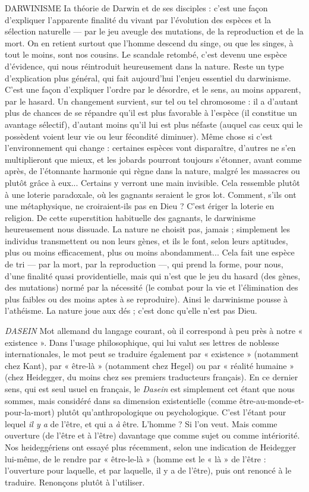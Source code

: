 DARWINISME Ia théorie de Darwin et de ses disciples : c’est une façon
d’expliquer l’apparente finalité du vivant par l’évolution des
espèces et la sélection naturelle — par le jeu aveugle des mutations, de la reproduction
et de la mort. On en retient surtout que l’homme descend du singe, ou
que les singes, à tout le moins, sont nos cousins. Le scandale retombé, c’est
devenu une espèce d’évidence, qui nous réintroduit heureusement dans la
nature. Reste un type d’explication plus général, qui fait aujourd’hui l’enjeu
essentiel du darwinisme. C’est une façon d’expliquer l’ordre par le désordre, et
le sens, au moins apparent, par le hasard. Un changement survient, sur tel ou
tel chromosome : il a d’autant plus de chances de se répandre qu’il est plus
favorable à l’espèce (il constitue un avantage sélectif), d'autant moins qu’il lui
est plus néfaste (auquel cas ceux qui le possèdent voient leur vie ou leur fécondité
diminuer). Même chose si c’est l’environnement qui change : certaines
espèces vont disparaître, d’autres ne s’en multiplieront que mieux, et les jobards
pourront toujours s'étonner, avant comme après, de l’étonnante harmonie qui
règne dans la nature, malgré les massacres ou plutôt grâce à eux... Certains y
verront une main invisible. Cela ressemble plutôt à une loterie paradoxale, où
les gagnants seraient le gros lot. Comment, s’ils ont une métaphysique, ne croiraient-ils
pas en Dieu ? C’est ériger la loterie en religion. De cette superstition
habituelle des gagnants, le darwinisme heureusement nous dissuade. La nature
ne choisit pas, jamais ; simplement les individus transmettent ou non leurs
gènes, et ils le font, selon leurs aptitudes, plus ou moins efficacement, plus ou
moins abondamment... Cela fait une espèce de tri — par la mort, par la reproduction —,
qui prend la forme, pour nous, d’une finalité quasi providentielle,
mais qui n’est que le jeu du hasard (des gènes, des mutations) normé par la
nécessité (le combat pour la vie et l'élimination des plus faibles ou des moins
aptes à se reproduire). Ainsi le darwinisme pousse à l’athéisme. La nature joue
aux dés ; c’est donc qu’elle n’est pas Dieu.

{\it DASEIN} Mot allemand du langage courant, où il correspond à peu près à
notre « existence ». Dans l’usage philosophique, qui lui valut ses
lettres de noblesse internationales, le mot peut se traduire également par
« existence » (notamment chez Kant), par « être-là » (notamment chez Hegel)
ou par « réalité humaine » (chez Heidegger, du moins chez ses premiers traducteurs
français). En ce dernier sens, qui est seul usuel en français, le {\it Dasein} est
simplement cet étant que nous sommes, mais considéré dans sa dimension existentielle
(comme être-au-monde-et-pour-la-mort) plutôt qu’anthropologique
ou psychologique. C’est l’étant pour lequel {\it il y a} de l'être, et qui a {\it à} être.
L'homme ? Si l’on veut. Mais comme ouverture (de l’être et à l’être) davantage
que comme sujet ou comme intériorité. Nos heideggériens ont essayé plus
récemment, selon une indication de Heidegger lui-même, de le rendre par
« être-le-là » (homme est le « là » de l'être : l'ouverture pour laquelle, et par
laquelle, il y a de l'être), puis ont renoncé à le traduire. Renonçons plutôt à
l'utiliser.

